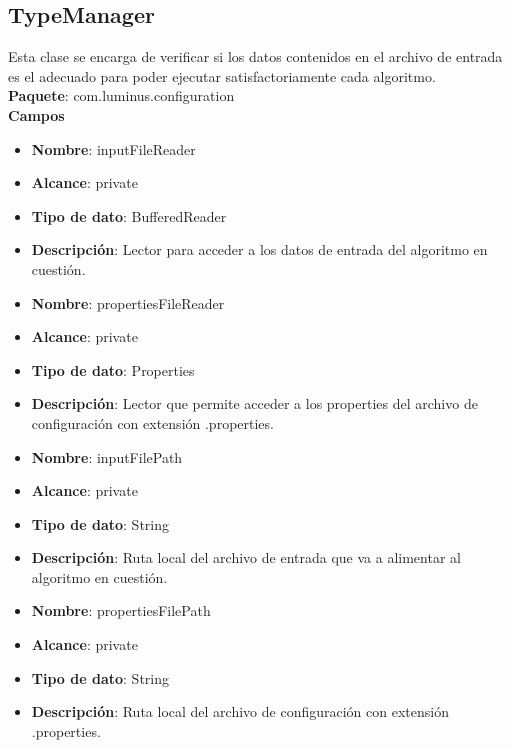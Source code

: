 \subsection{TypeManager}
Esta clase se encarga de verificar si los datos contenidos en el archivo de entrada es el adecuado para poder ejecutar satisfactoriamente cada algoritmo.\\
\textbf{Paquete}: com.luminus.configuration\\
\textbf{Campos}
\begin{UClist}
	\begin{itemize}
		\item \textbf{Nombre}: inputFileReader
		\item \textbf{Alcance}: private
		\item \textbf{Tipo de dato}: BufferedReader
		\item \textbf{Descripción}: Lector para acceder a los datos de entrada del algoritmo en cuestión.\\
	\end{itemize}
	\begin{itemize}
		\item \textbf{Nombre}: propertiesFileReader
		\item \textbf{Alcance}: private
		\item \textbf{Tipo de dato}: Properties
		\item \textbf{Descripción}: Lector que permite acceder a los properties del archivo de configuración con extensión .properties.\\
	\end{itemize}
	\begin{itemize}
		\item \textbf{Nombre}: inputFilePath
		\item \textbf{Alcance}: private
		\item \textbf{Tipo de dato}: String
		\item \textbf{Descripción}: Ruta local del archivo de entrada que va a alimentar al algoritmo en cuestión.\\
	\end{itemize}
	\begin{itemize}
		\item \textbf{Nombre}: propertiesFilePath
		\item \textbf{Alcance}: private
		\item \textbf{Tipo de dato}: String
		\item \textbf{Descripción}: Ruta local del archivo de configuración con extensión .properties.\\
	\end{itemize}
\end{UClist}
